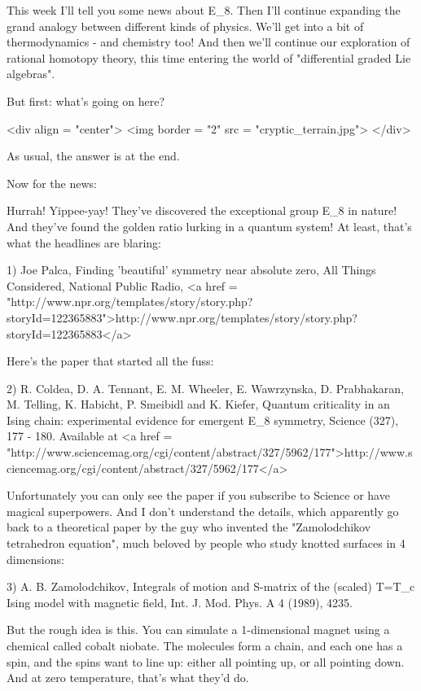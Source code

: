 

This week I'll tell you some news about E_{8}.  Then I'll continue
expanding the grand analogy between different kinds of physics.  We'll
get into a bit of thermodynamics - and chemistry too!  And then we'll
continue our exploration of rational homotopy theory, this time
entering the world of "differential graded Lie algebras".

But first: what's going on here? 

<div align = "center">
<img border = "2" src = "cryptic_terrain.jpg">
</div>

As usual, the answer is at the end.  

Now for the news:

Hurrah!  Yippee-yay!  They've discovered the exceptional group
E_{8} in nature!  And they've found the golden ratio lurking
in a quantum system!  At least, that's what the headlines are blaring:

1) Joe Palca, Finding 'beautiful' symmetry near absolute zero,
All Things Considered, National Public Radio, 
<a href = "http://www.npr.org/templates/story/story.php?storyId=122365883">http://www.npr.org/templates/story/story.php?storyId=122365883</a>

Here's the paper that started all the fuss:

2) R. Coldea, D. A. Tennant, E. M. Wheeler, E. Wawrzynska,
D. Prabhakaran, M. Telling, K. Habicht, P. Smeibidl and K. Kiefer,
Quantum criticality in an Ising chain: experimental evidence for
emergent E_{8} symmetry, Science (327), 177 - 180.  Available at
<a href = "http://www.sciencemag.org/cgi/content/abstract/327/5962/177">http://www.sciencemag.org/cgi/content/abstract/327/5962/177</a>

Unfortunately you can only see the paper if you subscribe to Science
or have magical superpowers.  And I don't understand the details,
which apparently go back to a theoretical paper by the guy who
invented the "Zamolodchikov tetrahedron equation",
much beloved by people who study knotted surfaces in 4 dimensions:

3) A. B. Zamolodchikov, Integrals of motion and S-matrix of the
(scaled) T=T_{c} Ising model with magnetic field, Int. J. Mod. Phys. A 
4 (1989), 4235.

But the rough idea is this.  You can simulate a 1-dimensional magnet
using a chemical called cobalt niobate.  The molecules form a chain,
and each one has a spin, and the spins want to line up: either all
pointing up, or all pointing down.  And at zero temperature, that's
what they'd do.

